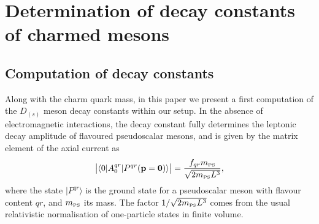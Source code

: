 

\section{Determination of decay constants of charmed mesons}
\label{sec:fDs}

\subsection{Computation of decay constants}

Along with the charm quark mass, in this paper we present a first computation of the $D_{(s)}$
meson decay constants within our setup. In the absence of electromagnetic interactions, the
decay constant fully determines the leptonic decay amplitude of flavoured pseudoscalar mesons,
and is given by the matrix element of the axial current as 
\begin{equation}
	\big| \langle 0 | A_0^{qr} | P^{qr}(\mathbf{p=0})\rangle\big| = \frac{f_{qr} m_{\rm\scriptscriptstyle PS}}{\sqrt{2m_{\rm\scriptscriptstyle PS}L^3}},
	\label{eq:decay_constant_definition}
\end{equation}
where the state $|P^{qr}\rangle$ is the ground state for a pseudoscalar meson with flavour content $qr$,
and $m_{\rm\scriptscriptstyle PS}$ its mass.
The factor $1/\sqrt{2m_{\rm\scriptscriptstyle PS}L^3}$ comes from the usual relativistic normalisation
of one-particle states in finite volume.

